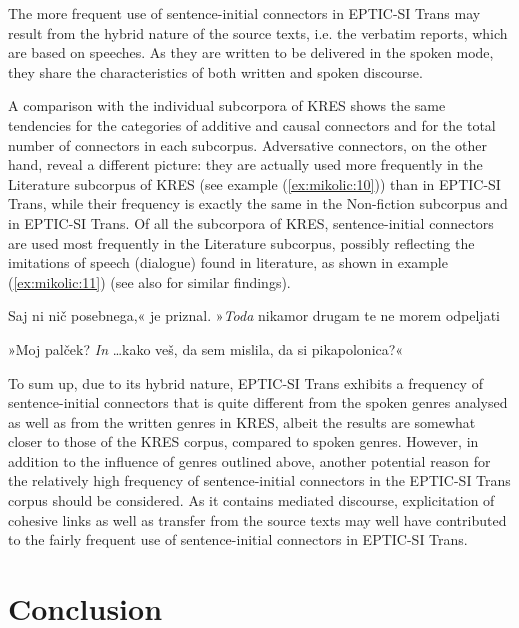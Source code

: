 \documentclass[output=paper]{langscibook}
\begin{document}
The more frequent use of sentence-initial connectors in EPTIC-SI Trans may result from the hybrid nature of the source texts, i.e. the verbatim reports, which are based on speeches. As they are written to be delivered in the spoken mode, they share the characteristics of both written and spoken discourse.

A comparison with the individual subcorpora of KRES shows the same tendencies for the categories of additive and causal connectors and for the total number of connectors in each subcorpus. Adversative connectors, on the other hand, reveal a different picture: they are actually used more frequently in the Literature subcorpus of KRES (see example (\ref{ex:mikolic:10})) than in EPTIC-SI Trans, while their frequency is exactly the same in the Non-fiction subcorpus and in EPTIC-SI Trans. Of all the subcorpora of KRES, sentence-initial connectors are used most frequently in the Literature subcorpus, possibly reflecting the imitations of speech (dialogue) found in literature, as shown in example (\ref{ex:mikolic:11}) (see also \citealt[84]{BiberEtAl1999} for similar findings).

\ea\label{ex:mikolic:11}
Saj ni nič posebnega,« je priznal. »\textit{Toda} nikamor drugam te ne morem odpeljati \\
\z

\newpage
\ea\label{ex:mikolic:12}
»Moj palček? \textit{In}  \ldots kako veš, da sem mislila, da si pikapolonica?« \\
\z

To sum up, due to its hybrid nature, EPTIC-SI Trans exhibits a frequency of sentence-initial connectors that is quite different from the spoken genres analysed as well as from the written genres in KRES, albeit the results are somewhat closer to those of the KRES corpus, compared to spoken genres. However, in addition to the influence of genres outlined above, another potential reason for the relatively high frequency of sentence-initial connectors in the EPTIC-SI Trans corpus should be considered. As it contains mediated discourse, explicitation of cohesive links as well as transfer from the source texts may well have contributed to the fairly frequent use of sentence-initial connectors in EPTIC-SI Trans. 

\section{
Conclusion
}\label{sec:mikolic:6}
\end{document}
